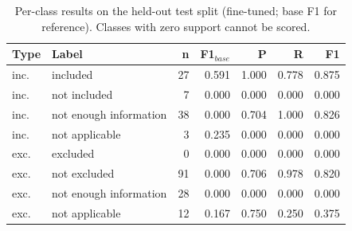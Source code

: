 \begin{table}[t]
\centering
\footnotesize
\caption{Per-class results on the held-out test split (fine-tuned; base F1 for reference). Classes with zero support cannot be scored.}
\label{tab:perclass}
\begin{tabular}{llrrrrr}
\toprule
Type & Label & n & F1$_{base}$ & P & R & F1 \\
\midrule
inc. & included & 27 & 0.591 & 1.000 & 0.778 & 0.875 \\
inc. & not included & 7 & 0.000 & 0.000 & 0.000 & 0.000 \\
inc. & not enough information & 38 & 0.000 & 0.704 & 1.000 & 0.826 \\
inc. & not applicable & 3 & 0.235 & 0.000 & 0.000 & 0.000 \\
exc. & excluded & 0 & 0.000 & 0.000 & 0.000 & 0.000 \\
exc. & not excluded & 91 & 0.000 & 0.706 & 0.978 & 0.820 \\
exc. & not enough information & 28 & 0.000 & 0.000 & 0.000 & 0.000 \\
exc. & not applicable & 12 & 0.167 & 0.750 & 0.250 & 0.375 \\
\bottomrule
\end{tabular}
\end{table}
